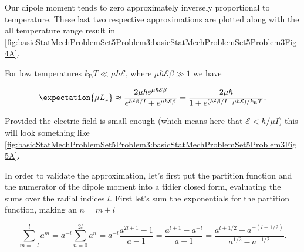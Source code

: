 {Our dipole moment tends to zero approximately inversely proportional to temperature.   These last two respective approximations are plotted along with the all temperature range result in \cref{fig:basicStatMechProblemSet5Problem3:basicStatMechProblemSet5Problem3Fig4A}.


For low temperatures $k_{\mathrm{B}} T \ll \mu \hbar \mathcal{E}$, where $\mu \hbar \mathcal{E} \beta \gg 1$ we have

\begin{dmath}\label{eqn:basicStatMechProblemSet5Problem3:740}
\expectation{ \mu L_z } \approx
\frac
{ 2 \mu \hbar e^{\mu \hbar \mathcal{E} \beta} }
{ e^{\hbar^2 \beta/I} + e^{\mu \hbar \mathcal{E} \beta} }
=
\frac
{ 2 \mu \hbar }
{ 1 + e^{ (\hbar^2 \beta/I - \mu \hbar \mathcal{E})/{k_{\mathrm{B}} T} } }.
\end{dmath}

Provided the electric field is small enough (which means here that $\mathcal{E} < \hbar/\mu I$) this will look something like \cref{fig:basicStatMechProblemSet5Problem3:basicStatMechProblemSet5Problem3Fig5A}.



In order to validate the approximation, let's first put the partition function and the numerator of the dipole moment into a tidier closed form, evaluating the sums over the radial indices $l$.  First let's sum the exponentials for the partition function, making an $n = m + l$ 

\begin{dmath}\label{eqn:basicStatMechProblemSet5Problem3:420}
\sum_{m = -l}^l a^m
=
a^{-l} \sum_{n=0}^{2l} a^n
=
a^{-l} \frac{a^{2l + 1} - 1}{a - 1}
=
\frac{a^{l + 1} - a^{-l}}{a - 1}
=
\frac{a^{l + 1/2} - a^{-(l+1/2)}}{a^{1/2} - a^{-1/2}}.
\end{dmath}

}

